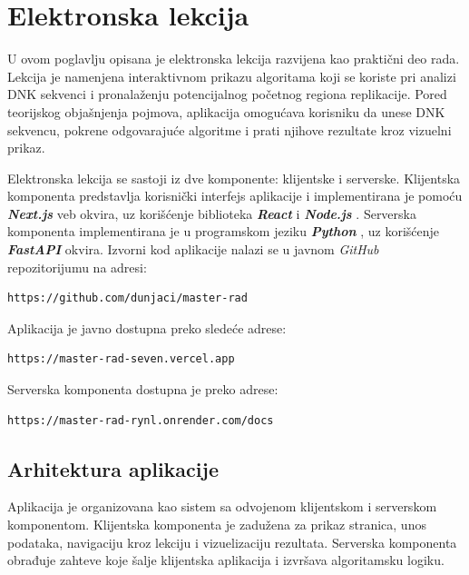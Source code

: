 \documentclass[12pt,oneside]{memoir}
\begin{document}
\chapter{Elektronska lekcija}

U ovom poglavlju opisana je elektronska lekcija razvijena kao praktični deo rada. Lekcija je namenjena interaktivnom prikazu algoritama koji se koriste pri analizi DNK sekvenci i pronalaženju potencijalnog početnog regiona replikacije. Pored teorijskog objašnjenja pojmova, aplikacija omogućava korisniku da unese DNK sekvencu, pokrene odgovarajuće algoritme i prati njihove rezultate kroz vizuelni prikaz.

Elektronska lekcija se sastoji iz dve komponente: klijentske i serverske. Klijentska komponenta predstavlja korisnički interfejs aplikacije i implementirana je pomoću \textbf{\textit{Next.js}} \cite{nextjs} veb okvira, uz korišćenje biblioteka \textbf{\textit{React}} \cite{react} i \textbf{\textit{Node.js}} \cite{node}. Serverska komponenta implementirana je u programskom jeziku \textbf{\textit{Python}} \cite{python}, uz korišćenje \textbf{\textit{FastAPI}}\cite{fastapi} okvira. Izvorni kod aplikacije nalazi se u javnom \emph{\textit{GitHub}} \cite{github} repozitorijumu na adresi:
\begin{verbatim}
https://github.com/dunjaci/master-rad
\end{verbatim}

Aplikacija je javno dostupna preko sledeće adrese:
\begin{verbatim}
https://master-rad-seven.vercel.app
\end{verbatim}

Serverska komponenta dostupna je preko adrese:
\begin{verbatim}
https://master-rad-rynl.onrender.com/docs
\end{verbatim}


\section{Arhitektura aplikacije}

Aplikacija je organizovana kao sistem sa odvojenom klijentskom i serverskom komponentom. Klijentska komponenta je zadužena za prikaz stranica, unos podataka, navigaciju kroz lekciju i vizuelizaciju rezultata. Serverska komponenta obrađuje zahteve koje šalje klijentska aplikacija i izvršava algoritamsku logiku.
\end{document}
